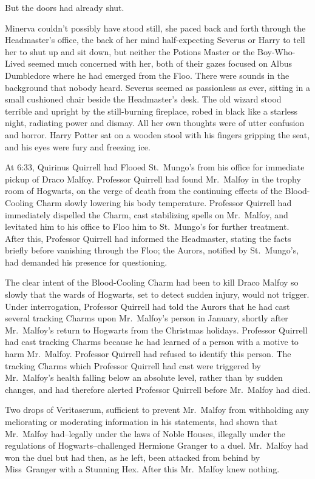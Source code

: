 But the doors had already shut.

\later

Minerva couldn't possibly have stood still, she paced back and forth through the Headmaster's office, the back of her mind half-expecting Severus or Harry to tell her to shut up and sit down, but neither the Potions Master or the Boy-Who-Lived seemed much concerned with her, both of their gazes focused on Albus Dumbledore where he had emerged from the Floo. There were sounds in the background that nobody heard. Severus seemed as passionless as ever, sitting in a small cushioned chair beside the Headmaster's desk. The old wizard stood terrible and upright by the still-burning fireplace, robed in black like a starless night, radiating power and dismay. All her own thoughts were of utter confusion and horror. Harry Potter sat on a wooden stool with his fingers gripping the seat, and his eyes were fury and freezing ice.

At 6:33\am, Quirinus Quirrell had Flooed St.~Mungo's from his office for immediate pickup of Draco Malfoy. Professor Quirrell had found Mr.~Malfoy in the trophy room of Hogwarts, on the verge of death from the continuing effects of the Blood-Cooling Charm slowly lowering his body temperature. Professor Quirrell had immediately dispelled the Charm, cast stabilizing spells on Mr.~Malfoy, and levitated him to his office to Floo him to St.~Mungo's for further treatment. After this, Professor Quirrell had informed the Headmaster, stating the facts briefly before vanishing through the Floo; the Aurors, notified by St.~Mungo's, had demanded his presence for questioning.

The clear intent of the Blood-Cooling Charm had been to kill Draco Malfoy so slowly that the wards of Hogwarts, set to detect sudden injury, would not trigger. Under interrogation, Professor Quirrell had told the Aurors that he had cast several tracking Charms upon Mr.~Malfoy's person in January, shortly after Mr.~Malfoy's return to Hogwarts from the Christmas holidays. Professor Quirrell had cast tracking Charms because he had learned of a person with a motive to harm Mr.~Malfoy. Professor Quirrell had refused to identify this person. The tracking Charms which Professor Quirrell had cast were triggered by Mr.~Malfoy's health falling below an absolute level, rather than by sudden changes, and had therefore alerted Professor Quirrell before Mr.~Malfoy had died.

Two drops of Veritaserum, sufficient to prevent Mr.~Malfoy from withholding any meliorating or moderating information in his statements, had shown that Mr.~Malfoy had\---legally under the laws of Noble Houses, illegally under the regulations of Hogwarts\---challenged Hermione Granger to a duel. Mr.~Malfoy had won the duel but had then, as he left, been attacked from behind by Miss~Granger with a Stunning Hex. After this Mr.~Malfoy knew nothing.

